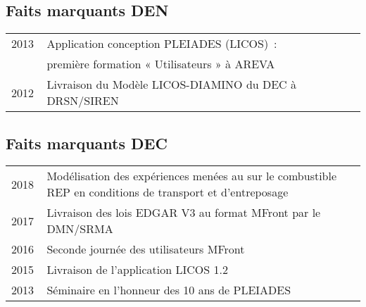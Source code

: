 \documentclass[11pt,a4paper]{moderncv}
\let\origsubsection\subsection%
\let\subsection\section%
\let\subsection\origsubsection%
\begin{document}
\subsection{Faits marquants DEN}

\begin{tabular}[htbp]{p{0.1\linewidth}p{0.9\linewidth}}
  2013 & Application conception PLEIADES (LICOS)~: \\ 
       & première formation « Utilisateurs » à AREVA \\
  2012 & Livraison du Modèle LICOS-DIAMINO du DEC à DRSN/SIREN \\
\end{tabular}

\subsection{Faits marquants DEC}

\begin{tabular}[htbp]{p{0.1\linewidth}p{0.9\linewidth}}
  2018 & Modélisation des expériences menées au sur le combustible REP en conditions de transport et d'entreposage \\
  2017 & Livraison des lois EDGAR V3 au format MFront par le DMN/SRMA \\
  2016 & Seconde journée des utilisateurs MFront \\
  2015 & Livraison de l’application LICOS 1.2 \\
  2013 & Séminaire en l’honneur des 10 ans de PLEIADES \\
\end{tabular}




\end{document}

